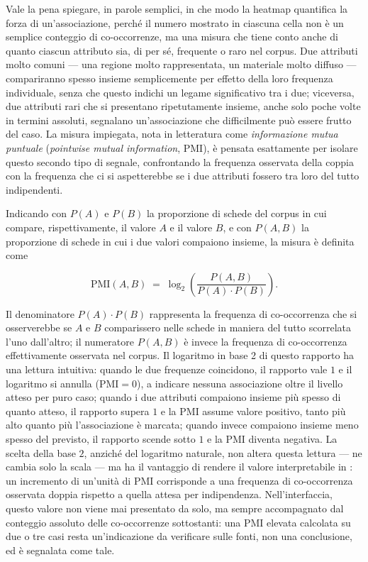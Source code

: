 \documentclass[11pt,a4paper]{article}
\begin{document}
Vale la pena spiegare, in parole semplici, in che modo la heatmap
quantifica la forza di un'associazione, perché il numero mostrato in
ciascuna cella non è un semplice conteggio di co-occorrenze, ma una
misura che tiene conto anche di quanto ciascun attributo sia, di per sé,
frequente o raro nel corpus. Due attributi molto comuni --- una regione
molto rappresentata, un materiale molto diffuso --- compariranno spesso
insieme semplicemente per effetto della loro frequenza individuale,
senza che questo indichi un legame significativo tra i due; viceversa,
due attributi rari che si presentano ripetutamente insieme, anche solo
poche volte in termini assoluti, segnalano un'associazione che difficilmente
può essere frutto del caso. La misura impiegata, nota in letteratura come
\emph{informazione mutua puntuale} (\emph{pointwise mutual information},
PMI), è pensata esattamente per isolare questo secondo tipo di
segnale, confrontando la frequenza osservata della coppia con la
frequenza che ci si aspetterebbe se i due attributi fossero tra loro
del tutto indipendenti.

Indicando con $P(A)$ e $P(B)$ la proporzione di schede del corpus in cui
compare, rispettivamente, il valore $A$ e il valore $B$, e con $P(A,B)$
la proporzione di schede in cui i due valori compaiono insieme, la
misura è definita come

\[
  \mathrm{PMI}(A,B) \;=\; \log_2 \left( \frac{P(A,B)}{P(A)\cdot P(B)} \right).
\]

Il denominatore $P(A) \cdot P(B)$ rappresenta la frequenza di
co-occorrenza che si osserverebbe se $A$ e $B$ comparissero nelle schede
in maniera del tutto scorrelata l'uno dall'altro; il numeratore $P(A,B)$
è invece la frequenza di co-occorrenza effettivamente osservata nel
corpus. Il logaritmo in base 2 di questo rapporto ha una lettura
intuitiva: quando le due frequenze coincidono, il rapporto vale $1$ e il
logaritmo si annulla ($\mathrm{PMI}=0$), a indicare nessuna associazione
oltre il livello atteso per puro caso; quando i due attributi compaiono
insieme più spesso di quanto atteso, il rapporto supera $1$ e la PMI
assume valore positivo, tanto più alto quanto più l'associazione è
marcata; quando invece compaiono insieme meno spesso del previsto, il
rapporto scende sotto $1$ e la PMI diventa negativa. La scelta della base
$2$, anziché del logaritmo naturale, non altera questa lettura --- ne
cambia solo la scala --- ma ha il vantaggio di rendere il valore
interpretabile in : un incremento di un'unità di PMI
corrisponde a una frequenza di co-occorrenza osservata doppia rispetto a
quella attesa per indipendenza. Nell'interfaccia, questo valore non viene
mai presentato da solo, ma sempre accompagnato dal conteggio assoluto
delle co-occorrenze sottostanti: una PMI elevata calcolata su due o tre
casi resta un'indicazione da verificare sulle fonti, non una conclusione,
ed è segnalata come tale.
\end{document}
